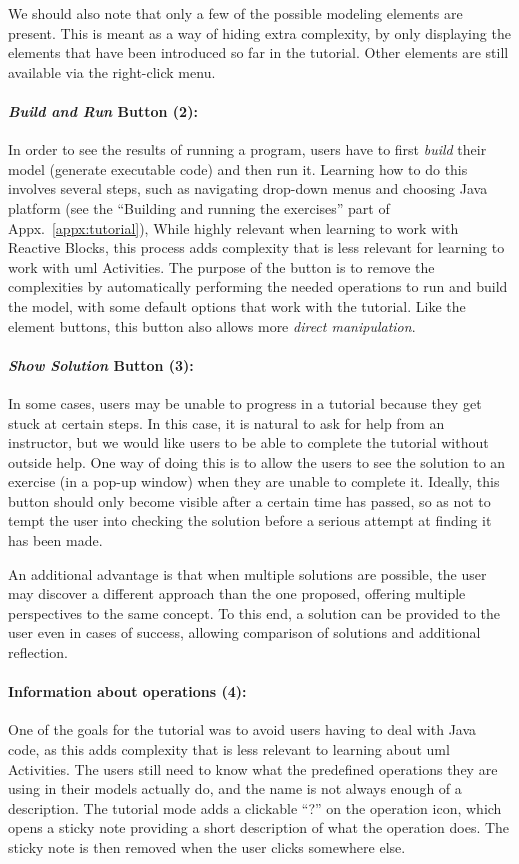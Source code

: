 \noindent
We should also note that only a few of the possible modeling elements are present. This is meant as a way of hiding extra complexity, by only displaying the elements that have been introduced so far in the tutorial. Other elements are still available via the right-click menu.

\paragraph{\emph{Build and Run} Button (2):} In order to see the results of running a program, users have to first \emph{build} their model (generate executable code) and then run it. Learning how to do this involves several steps, such as navigating drop-down menus and choosing Java platform (see the ``Building and running the exercises'' part of Appx.~\ref{appx:tutorial}), While highly relevant when learning to work with Reactive Blocks, this process adds complexity that is less relevant for learning to work with \gls{uml} Activities. The purpose of the button is to remove the complexities by automatically performing the needed operations to run and build the model, with some default options that work with the tutorial. Like the element buttons, this button also allows more \emph{direct manipulation}.

\paragraph{\emph{Show Solution} Button (3):} In some cases, users may be unable to progress in a tutorial because they get stuck at certain steps. In this case, it is natural to ask for help from an instructor, but we would like users to be able to complete the tutorial without outside help. One way of doing this is to allow the users to see the solution to an exercise (in a pop-up window) when they are unable to complete it. Ideally, this button should only become visible after a certain time has passed, so as not to tempt the user into checking the solution before a serious attempt at finding it has been made.

\noindent
An additional advantage is that when multiple solutions are possible, the user may discover a different approach than the one proposed, offering multiple perspectives to the same concept. To this end, a solution can be provided to the user even in cases of success, allowing comparison of solutions and additional reflection.

\paragraph{Information about operations (4):} One of the goals for the tutorial was to avoid users having to deal with Java code, as this adds complexity that is less relevant to learning about \gls{uml} Activities. The users still need to know what the predefined operations they are using in their models actually do, and the name is not always enough of a description. The tutorial mode adds a clickable ``?'' on the operation icon, which opens a sticky note providing a short description of what the operation does. The sticky note is then removed when the user clicks somewhere else.

